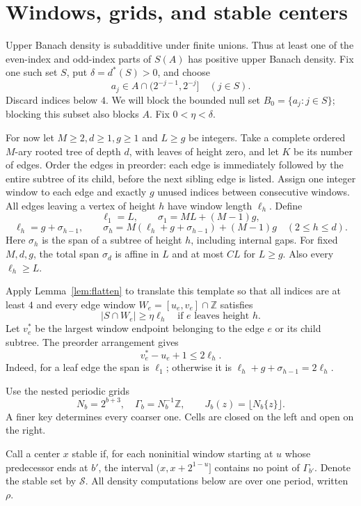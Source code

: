 \documentclass[11pt]{article}
\theoremstyle{remark}\newtheorem{remark}[theorem]{Remark}
\newcommand{\Z}{\mathbb Z}\newcommand{\Prob}{\mathbb P}
\begin{document}
\section{Windows, grids, and stable centers}
Upper Banach density is subadditive under finite unions. Thus at least one of the even-index and odd-index parts of $S(A)$ has positive upper Banach density. Fix one such set $S$, put $\delta=d^*(S)>0$, and choose
\[
 a_j\in A\cap(2^{-j-1},2^{-j}]\quad(j\in S).
\]
Discard indices below $4$. We will block the bounded null set $B_0=\{a_j:j\in S\}$; blocking this subset also blocks $A$. Fix $0<\eta<\delta$.

For now let $M\ge2,d\ge1,g\ge1$ and $L\ge g$ be integers. Take a complete ordered $M$-ary rooted tree of depth $d$, with leaves of height zero, and let $K$ be its number of edges. Order the edges in preorder: each edge is immediately followed by the entire subtree of its child, before the next sibling edge is listed. Assign one integer window to each edge and exactly $g$ unused indices between consecutive windows. All edges leaving a vertex of height $h$ have window length $\ell_h$. Define
\[
 \ell_1=L,\qquad \sigma_1=ML+(M-1)g,
\]
\[
 \ell_h=g+\sigma_{h-1},\qquad
 \sigma_h=M(\ell_h+g+\sigma_{h-1})+(M-1)g\quad(2\le h\le d).
\]
Here $\sigma_h$ is the span of a subtree of height $h$, including internal gaps. For fixed $M,d,g$, the total span $\sigma_d$ is affine in $L$ and at most $C L$ for $L\ge g$. Also every $\ell_h\ge L$.

Apply Lemma~\ref{lem:flatten} to translate this template so that all indices are at least $4$ and every edge window $W_e=[u_e,v_e]\cap\Z$ satisfies
\begin{equation}\label{eq:occupied}
 |S\cap W_e|\ge\eta\ell_h
 \quad\text{if }e\text{ leaves height }h.
\end{equation}
Let $v_e^*$ be the largest window endpoint belonging to the edge $e$ or its child subtree. The preorder arrangement gives
\begin{equation}\label{eq:span}
 v_e^*-u_e+1\le2\ell_h.
\end{equation}
Indeed, for a leaf edge the span is $\ell_1$; otherwise it is $\ell_h+g+\sigma_{h-1}=2\ell_h$.

Use the nested periodic grids
\[
 N_b=2^{b+3},\quad \Gamma_b=N_b^{-1}\Z,
 \qquad J_b(z)=\lfloor N_b\{z\}\rfloor.
\]
A finer key determines every coarser one. Cells are closed on the left and open on the right.

Call a center $x$ stable if, for each noninitial window starting at $u$ whose predecessor ends at $b'$, the interval $(x,x+2^{1-u}]$ contains no point of $\Gamma_{b'}$. Denote the stable set by $\mathcal S$. All density computations below are over one period, written $\rho$.
\end{document}
